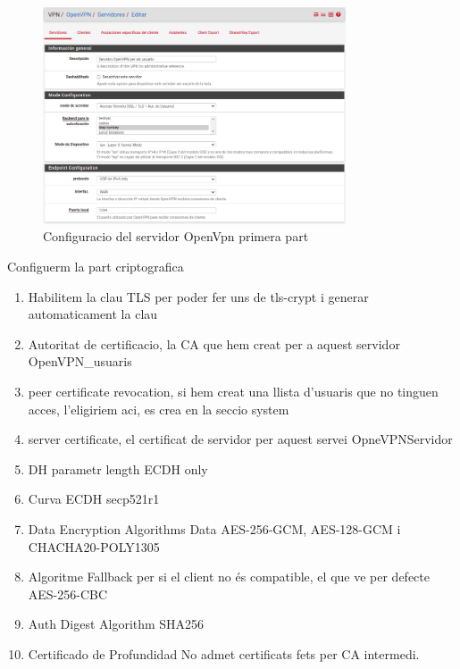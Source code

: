 \documentclass[
  10pt,
]{krantz}
\providecommand{\tightlist}{%
  \setlength{\itemsep}{0pt}\setlength{\parskip}{0pt}}
\begin{document}
\begin{figure}
\centering
\includegraphics[width=0.8\textwidth,height=\textheight]{imatges/proxmox/Conf_VPN_server1.png}
\caption{Configuracio del servidor OpenVpn primera part}
\end{figure}

Configuerm la part criptografica

\begin{enumerate}
\def\labelenumi{\arabic{enumi}.}
\tightlist
\item
  Habilitem la clau TLS per poder fer uns de tls-crypt i generar automaticament la clau
\item
  Autoritat de certificacio, la CA que hem creat per a aquest servidor OpenVPN\_usuaris
\item
  peer certificate revocation, si hem creat una llista d'usuaris que no tinguen acces, l'eligiriem aci, es crea en la seccio system
\item
  server certificate, el certificat de servidor per aquest servei OpneVPNServidor
\item
  DH parametr length ECDH only
\item
  Curva ECDH secp521r1
\item
  Data Encryption Algorithms Data AES-256-GCM, AES-128-GCM i CHACHA20-POLY1305
\item
  Algoritme Fallback per si el client no és compatible, el que ve per defecte AES-256-CBC
\item
  Auth Digest Algorithm SHA256
\item
  Certificado de Profundidad No admet certificats fets per CA intermedi.
\end{enumerate}
\end{document}
